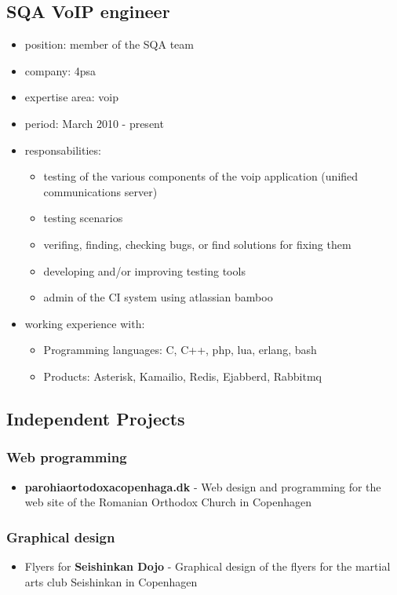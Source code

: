 \documentclass[a4paper,12pt,openany]{article}
\begin{document}
	\subsection{SQA VoIP engineer}
		\begin{itemize}
			\item position: member of the SQA team
			\item company: 4psa
			\item expertise area: voip 	
			\item period: March 2010 - present
			\item responsabilities: 
				\begin{itemize}
					\item testing of the various components of the voip application (unified communications server) 
					\item testing scenarios 
					\item verifing, finding, checking bugs, or find solutions for fixing them
					\item developing and/or improving testing tools
					\item admin of the CI system using atlassian bamboo
				\end{itemize}
			\item working experience with:
				\begin{itemize}				
					\item Programming languages: C, C++, php, lua, erlang, bash
					\item Products: Asterisk, Kamailio, Redis, Ejabberd, Rabbitmq
				\end{itemize}

		\end{itemize}

	\subsection{Independent Projects}
		\subsubsection{Web programming}
		\begin{itemize}
			\item \textbf{parohiaortodoxacopenhaga.dk} - Web design and programming for the web site of the Romanian Orthodox Church in Copenhagen 
		\end{itemize}

		\subsubsection{Graphical design}
		\begin{itemize}
			\item Flyers for \textbf{Seishinkan Dojo} - Graphical design of the flyers for the martial arts club Seishinkan in Copenhagen
		\end{itemize}
		
\end{document}
